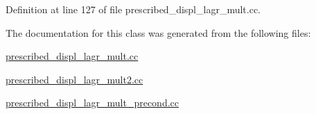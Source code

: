 Definition at line 127 of file prescribed\+\_\+displ\+\_\+lagr\+\_\+mult.\+cc.



The documentation for this class was generated from the following files\+:\begin{DoxyCompactItemize}
\item 
\hyperlink{prescribed__displ__lagr__mult_8cc}{prescribed\+\_\+displ\+\_\+lagr\+\_\+mult.\+cc}\item 
\hyperlink{prescribed__displ__lagr__mult2_8cc}{prescribed\+\_\+displ\+\_\+lagr\+\_\+mult2.\+cc}\item 
\hyperlink{prescribed__displ__lagr__mult__precond_8cc}{prescribed\+\_\+displ\+\_\+lagr\+\_\+mult\+\_\+precond.\+cc}\end{DoxyCompactItemize}
